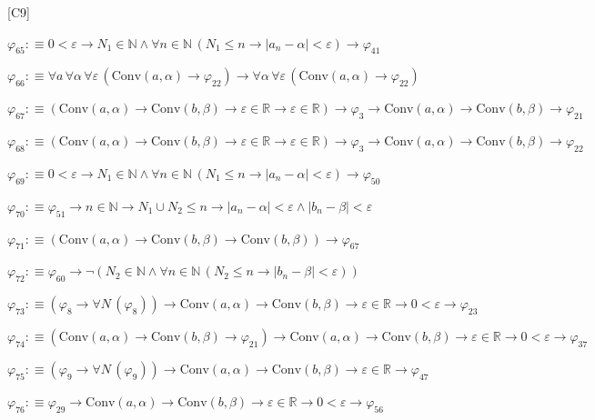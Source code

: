 \begin{fullproof}{[C9]}
\begin{abbrevlist}
\item $\varphi_{65} :\equiv 0 < \varepsilon \to N_{1} \in \mathbb{N} \land \forall n \in \mathbb{N}\,(N_{1} \leq n \to \lvert a_{n} - \alpha \rvert < \varepsilon) \to \varphi_{41}$
\item $\varphi_{66} :\equiv \forall a\,\forall \alpha\,\forall \varepsilon\,(\mathrm{Conv}(a,\alpha) \to \varphi_{22}) \to \forall \alpha\,\forall \varepsilon\,(\mathrm{Conv}(a,\alpha) \to \varphi_{22})$
\item $\varphi_{67} :\equiv (\mathrm{Conv}(a,\alpha) \to \mathrm{Conv}(b,\beta) \to \varepsilon \in \mathbb{R} \to \varepsilon \in \mathbb{R}) \to \varphi_{3} \to \mathrm{Conv}(a,\alpha) \to \mathrm{Conv}(b,\beta) \to \varphi_{21}$
\item $\varphi_{68} :\equiv (\mathrm{Conv}(a,\alpha) \to \mathrm{Conv}(b,\beta) \to \varepsilon \in \mathbb{R} \to \varepsilon \in \mathbb{R}) \to \varphi_{3} \to \mathrm{Conv}(a,\alpha) \to \mathrm{Conv}(b,\beta) \to \varphi_{22}$
\item $\varphi_{69} :\equiv 0 < \varepsilon \to N_{1} \in \mathbb{N} \land \forall n \in \mathbb{N}\,(N_{1} \leq n \to \lvert a_{n} - \alpha \rvert < \varepsilon) \to \varphi_{50}$
\item $\varphi_{70} :\equiv \varphi_{51} \to n \in \mathbb{N} \to N_{1} \cup N_{2} \leq n \to \lvert a_{n} - \alpha \rvert < \varepsilon \land \lvert b_{n} - \beta \rvert < \varepsilon$
\item $\varphi_{71} :\equiv (\mathrm{Conv}(a,\alpha) \to \mathrm{Conv}(b,\beta) \to \mathrm{Conv}(b,\beta)) \to \varphi_{67}$
\item $\varphi_{72} :\equiv \varphi_{60} \to \neg (N_{2} \in \mathbb{N} \land \forall n \in \mathbb{N}\,(N_{2} \leq n \to \lvert b_{n} - \beta \rvert < \varepsilon))$
\item $\varphi_{73} :\equiv (\varphi_{8} \to \forall N\,(\varphi_{8})) \to \mathrm{Conv}(a,\alpha) \to \mathrm{Conv}(b,\beta) \to \varepsilon \in \mathbb{R} \to 0 < \varepsilon \to \varphi_{23}$
\item $\varphi_{74} :\equiv (\mathrm{Conv}(a,\alpha) \to \mathrm{Conv}(b,\beta) \to \varphi_{21}) \to \mathrm{Conv}(a,\alpha) \to \mathrm{Conv}(b,\beta) \to \varepsilon \in \mathbb{R} \to 0 < \varepsilon \to \varphi_{37}$
\item $\varphi_{75} :\equiv (\varphi_{9} \to \forall N\,(\varphi_{9})) \to \mathrm{Conv}(a,\alpha) \to \mathrm{Conv}(b,\beta) \to \varepsilon \in \mathbb{R} \to \varphi_{47}$
\item $\varphi_{76} :\equiv \varphi_{29} \to \mathrm{Conv}(a,\alpha) \to \mathrm{Conv}(b,\beta) \to \varepsilon \in \mathbb{R} \to 0 < \varepsilon \to \varphi_{56}$

\end{abbrevlist}
\end{fullproof}
